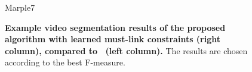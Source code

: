 \begin{figure}[htbp]
\begin{minipage}[t]{1\textwidth}
\end{minipage}
\begin{minipage}[t]{1\textwidth}
\centering
\footnotesize Marple7%

\end{minipage}
 \caption[Example video segmentation results of the proposed algorithm with learned must-link constraints, compared to~\cite{GalassoCS12}]{
  {\bf Example video segmentation results of the proposed algorithm with learned must-link constraints (right column), compared to~\cite{GalassoCS12} (left column).} The results are chosen according to the best F-measure.}
\label{fig:seg_res_sc}
\end{figure}

